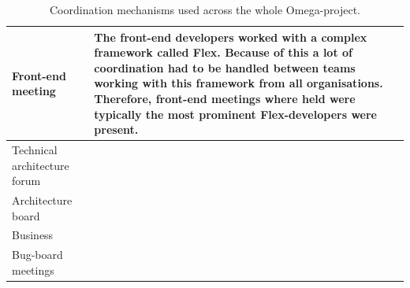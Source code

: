 \begin{table}[H]
\begin{center}
\begin{tabular}{| p{6cm} | p{9cm} |}
    Front-end meeting & The front-end developers worked with a complex framework called Flex. Because of this a lot of coordination had to be handled between teams working with this framework from all organisations. Therefore, front-end meetings where held were typically the most prominent Flex-developers were present. \\ \hline
    Technical architecture forum &  \\ \hline
    Architecture board & \\ \hline
    Business & \\ \hline
    Bug-board meetings  & \\ \hline
    \end{tabular}
    \caption{Coordination mechanisms used across the whole Omega-project.}
    \label{cmuatwo}
\end{center}
\end{table}

